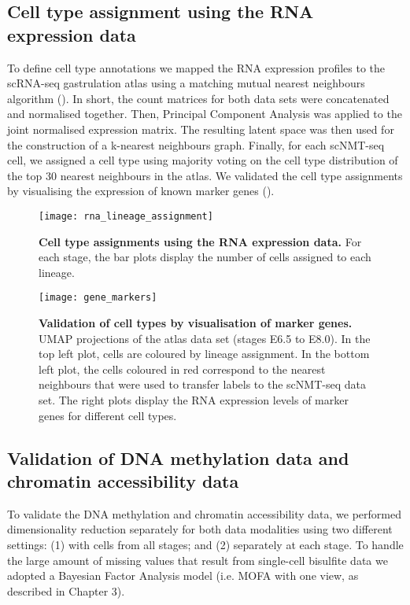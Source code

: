 \subsection{Cell type assignment using the RNA expression data}

To define cell type annotations we mapped the RNA expression profiles to the scRNA-seq gastrulation atlas \cite{Pijuan-Sala2019} using a matching mutual nearest neighbours algorithm \cite{Haghverdi2018} (). In short, the count matrices for both data sets were concatenated and normalised together. Then, Principal Component Analysis was applied to the joint normalised expression matrix. The resulting latent space was then used for the construction of a k-nearest neighbours graph. Finally, for each scNMT-seq cell, we assigned a cell type using majority voting on the cell type distribution of the top 30 nearest neighbours in the atlas. We validated the cell type assignments by visualising the expression of known marker genes ().

\begin{figure}[H]
	\centering
	\texttt{[image: rna\_lineage\_assignment]}
	\caption[]{\textbf{Cell type assignments using the RNA expression data.} For each stage, the bar plots display the number of cells assigned to each lineage.}
	\label{fig:lineage_assignment}
\end{figure}

\begin{figure}[H]
	\centering
	\texttt{[image: gene\_markers]}
	\caption[]{
	\textbf{Validation of cell types by visualisation of marker genes.} \\
	UMAP projections of the atlas data set (stages E6.5 to E8.0). In the top left plot, cells are coloured by lineage assignment. In the bottom left plot, the cells coloured in red correspond to the nearest neighbours that were used to transfer labels to the scNMT-seq data set. The right plots display the RNA expression levels of marker genes for different cell types.
	}
	\label{fig:gene_markers}
\end{figure}


\subsection{Validation of DNA methylation data and chromatin accessibility data}

To validate the DNA methylation and chromatin accessibility data, we performed dimensionality reduction separately for both data modalities using two different settings: (1) with cells from all stages; and (2) separately at each stage. To handle the large amount of missing values that result from single-cell bisulfite data we adopted a Bayesian Factor Analysis model (i.e. MOFA with one view, as described in Chapter 3). 

